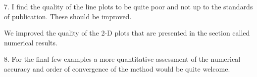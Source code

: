 \documentclass{article}
\begin{document}
{
\color{blue}
7. I find the quality of the line plots to be quite poor and not up to the
standards of publication. These should be improved.
}

We improved the quality of the 2-D plots that are presented in the section called numerical results.
\bigskip


{
\color{blue}
8. For the final few examples a more quantitative assessment of the
numerical accuracy and order of convergence of the method would be
quite welcome.
}

\bigskip
\end{document}
